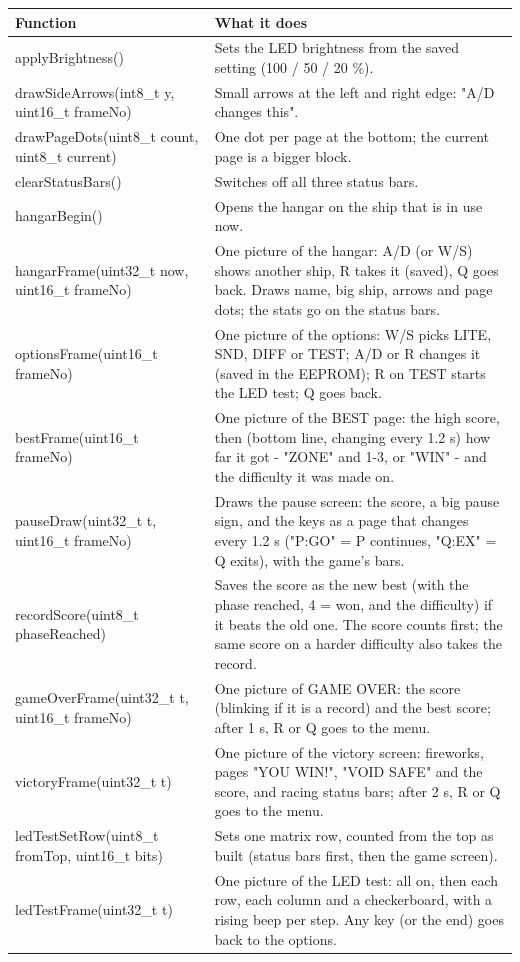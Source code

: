 \documentclass[11pt,a4paper]{article}
\begin{document}
{\footnotesize\begin{longtable}{|>{\raggedright\arraybackslash}p{5.82cm}|>{\raggedright\arraybackslash}p{10.68cm}|}
\hline\rowcolor{accent}\textbf{\color{white}Function} & \textbf{\color{white}What it does}\\\hline\endhead
applyBrightness() & Sets the LED brightness from the saved setting (100 / 50 / 20 \%).\\\hline
\rowcolor{rowshade}drawSideArrows(int8\_t y, uint16\_t frameNo) & Small arrows at the left and right edge: "A/D changes this".\\\hline
drawPageDots(uint8\_t count, uint8\_t current) & One dot per page at the bottom; the current page is a bigger block.\\\hline
\rowcolor{rowshade}clearStatusBars() & Switches off all three status bars.\\\hline
hangarBegin() & Opens the hangar on the ship that is in use now.\\\hline
\rowcolor{rowshade}hangarFrame(uint32\_t now, uint16\_t frameNo) & One picture of the hangar: A/D (or W/S) shows another ship, R takes it (saved), Q goes back. Draws name, big ship, arrows and page dots; the stats go on the status bars.\\\hline
optionsFrame(uint16\_t frameNo) & One picture of the options: W/S picks LITE, SND, DIFF or TEST; A/D or R changes it (saved in the EEPROM); R on TEST starts the LED test; Q goes back.\\\hline
\rowcolor{rowshade}bestFrame(uint16\_t frameNo) & One picture of the BEST page: the high score, then (bottom line, changing every 1.2 s) how far it got - "ZONE" and 1-3, or "WIN" - and the difficulty it was made on.\\\hline
pauseDraw(uint32\_t t, uint16\_t frameNo) & Draws the pause screen: the score, a big pause sign, and the keys as a page that changes every 1.2 s ("P:GO" = P continues, "Q:EX" = Q exits), with the game's bars.\\\hline
\rowcolor{rowshade}recordScore(uint8\_t phaseReached) & Saves the score as the new best (with the phase reached, 4 = won, and the difficulty) if it beats the old one. The score counts first; the same score on a harder difficulty also takes the record.\\\hline
gameOverFrame(uint32\_t t, uint16\_t frameNo) & One picture of GAME OVER: the score (blinking if it is a record) and the best score; after 1 s, R or Q goes to the menu.\\\hline
\rowcolor{rowshade}victoryFrame(uint32\_t t) & One picture of the victory screen: fireworks, pages "YOU WIN!", "VOID SAFE" and the score, and racing status bars; after 2 s, R or Q goes to the menu.\\\hline
ledTestSetRow(uint8\_t fromTop, uint16\_t bits) & Sets one matrix row, counted from the top as built (status bars first, then the game screen).\\\hline
\rowcolor{rowshade}ledTestFrame(uint32\_t t) & One picture of the LED test: all on, then each row, each column and a checkerboard, with a rising beep per step. Any key (or the end) goes back to the options.\\\hline
\end{longtable}}
\end{document}
